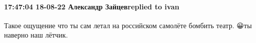  
 
 
 
 

\paragraph{17:47:04 18-08-22 Александр Зайцевreplied to ivan}

Такое ощущение что ты сам летал на российском самолёте бомбить театр. 😀ты
наверно наш лётчик.
